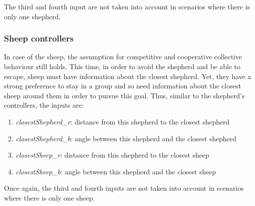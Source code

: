 \documentclass[conference]{IEEEtran}
\begin{document}
The third and fourth input are not taken into account in scenarios where there is only one shepherd. 

\vspace{1em}
\subsubsection{Sheep controllers}
In case of the sheep, the assumption for competitive and cooperative collective behaviour still holds. This time, in order to avoid the shepherd and be able to escape, sheep must have information about the closest shepherd. Yet, they have a strong preference to stay in a group and so need information about the closest sheep around them in order to pursue this goal. Thus, similar to the shepherd's controllers, the inputs are:

\begin{enumerate}
	\item \textit{closestShepherd\_r}: distance from this shepherd to the closest shepherd
	\item \textit{closestShepherd\_b}: angle between this shepherd and the closest shepherd
	\item \textit{closestSheep\_r}: distance from this shepherd to the closest sheep
	\item \textit{closestSheep\_b}: angle between this shepherd and the closest sheep
\end{enumerate}

Once again, the third and fourth inputs are not taken into account in scenarios where there is only one sheep. 
\end{document}
